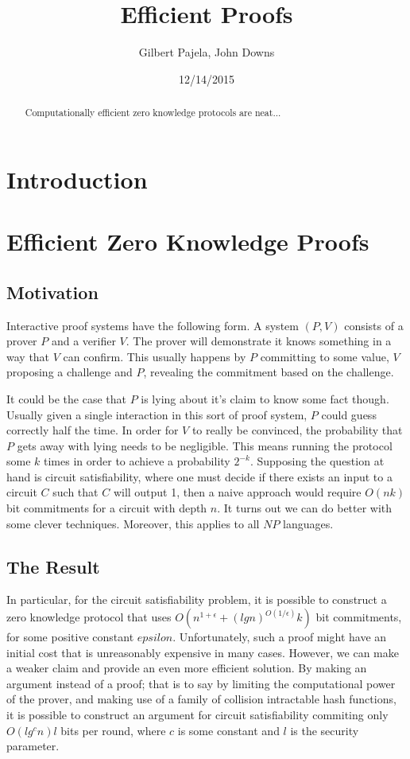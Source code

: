 \documentclass{article}
\title{Efficient Proofs}
\author{Gilbert Pajela, John Downs}
\date{12/14/2015}
\begin{document}
\maketitle

\begin{abstract}
Computationally efficient zero knowledge protocols are neat...
\end{abstract}

\section{Introduction}

\section{Efficient Zero Knowledge Proofs}

\subsection{Motivation}
Interactive proof systems have the following form. A system $(P,V)$
consists of a prover $P$
and a verifier $V$.
The prover will demonstrate it knows something in a way that $V$
can confirm. This usually happens by $P$
committing to some value, $V$
proposing a challenge and $P$,
revealing the commitment based on the challenge.

It could be the case that $P$
is lying about it's claim to know some fact though. Usually given a
single interaction in this sort of proof system, $P$
could guess correctly half the time. In order for $V$
to really be convinced, the probability that $P$
gets away with lying needs to be negligible. This means running the
protocol some $k$
times in order to achieve a probability $2^{-k}$.
Supposing the question at hand is circuit satisfiability, where one
must decide if there exists an input to a circuit $C$
such that $C$
will output 1, then a naive approach would require $O(nk)$
bit commitments for a circuit with depth $n$.
It turns out we can do better with some clever techniques. Moreover,
this applies to all $NP$ languages.

\subsection{The Result}
In particular, for the circuit satisfiability problem, it is possible
to construct a zero knowledge protocol that uses
$O(n^{1+\epsilon} + (lg n)^{O(1/\epsilon)}k)$
bit commitments, for some positive constant $epsilon$.
Unfortunately, such a proof might have an initial cost that is
unreasonably expensive in many cases. However, we can make a weaker
claim and provide an even more efficient solution. By making an
argument instead of a proof; that is to say by limiting the
computational power of the prover, and making use of a family of
collision intractable hash functions, it is possible to construct an
argument for circuit satisfiability commiting only $O(lg^{c}n)l$
bits per round, where $c$
is some constant and $l$ is the security parameter.
\end{document}

